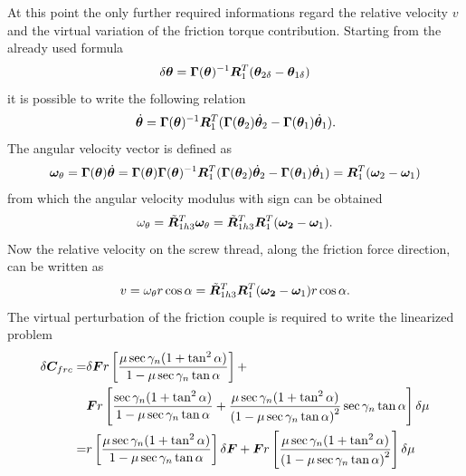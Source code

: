At this point the only further required informations regard the relative
velocity $v$ and the virtual variation of the friction torque
contribution. Starting from the already used formula
\begin{equation}
  \delta\bm{\theta}=\bm{\Gamma}(\bm{\theta})^{-1}\bm{R}^T_1(\bm{\theta}_{2\delta}-\bm{\theta}_{1\delta})
\end{equation}
it is possible to write the following relation
\begin{equation}
  \dot{\bm{\theta}}=\bm{\Gamma}(\bm{\theta})^{-1}\bm{R}^T_1
                   (\bm{\Gamma}(\bm{\theta}_2)\dot{\bm{\theta}}_{2}-\bm{\Gamma}(\bm{\theta}_1)\dot{\bm{\theta}}_{1}).
\end{equation}
The angular velocity vector is defined as
\begin{equation}
  \bm{\omega}_{\theta}=\bm{\Gamma}(\bm{\theta})\dot{\bm{\theta}}=\bm{\Gamma}(\bm{\theta})\bm{\Gamma}(\bm{\theta})^{-1}\bm{R}^T_1
                      (\bm{\Gamma}(\bm{\theta}_2)\dot{\bm{\theta}}_{2}-\bm{\Gamma}(\bm{\theta}_1)\dot{\bm{\theta}}_{1})
                     = \bm{R}^T_1(\bm{\omega}_{2}-\bm{\omega}_{1})
\end{equation}
from which the angular velocity modulus with sign can be obtained
\begin{equation}
  \omega_{\theta}=\tilde{\bm{R}}_{1h3}^T\bm{\omega}_{\theta}=\tilde{\bm{R}}_{1h3}^T\bm{R}_1^T(\bm{\omega_2}-\bm{\omega}_1).
\end{equation}
Now the relative velocity on the screw thread, along the friction force direction, can be 
written as
\begin{equation}
  v=\omega_\theta r\cos{\alpha}=\tilde{\bm{R}}_{1h3}^T\bm{R}_1^T(\bm{\omega_2}-\bm{\omega}_1)r\cos{\alpha}.
\end{equation} 
The virtual perturbation of the friction couple is required to write the 
linearized problem
\begin{align}
  \nonumber
  \delta\bm{C}_{frc}=&\delta\bm{F}r\left[\frac{\mu\sec{\gamma_n}(1+\tan^2{\alpha})}{1-\mu\sec{\gamma_n}\tan{\alpha}}\right]+\\
                    \nonumber
                    &\bm{F}r\left[\frac{\sec{\gamma_n}(1+\tan^2{\alpha})}{1-\mu\sec{\gamma_n}\tan{\alpha}}+
		    \frac{\mu\sec{\gamma_n}(1+\tan^2{\alpha})}{\left(1-\mu\sec{\gamma_n}\tan{\alpha}\right)^2}
		    \sec{\gamma_n}\tan{\alpha}\right]
		    \delta\mu\\
		    =&r\left[\frac{\mu\sec{\gamma_n}(1+\tan^2{\alpha})}{1-\mu\sec{\gamma_n}\tan{\alpha}}\right]\delta\bm{F}+
		     \bm{F}r\left[\frac{\mu\sec{\gamma_n}(1+\tan^2{\alpha})}{\left(1-\mu\sec{\gamma_n}\tan{\alpha}\right)^2}\right]
		     \delta\mu
\end{align}
